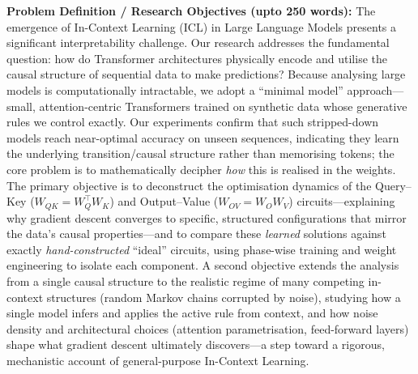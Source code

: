 \documentclass[12pt]{article}
\begin{document}
\medskip
\noindent\textbf{Problem Definition / Research Objectives (upto 250 words):}
The emergence of In-Context Learning (ICL) in Large Language Models presents a significant
interpretability challenge. Our research addresses the fundamental question: how do Transformer
architectures physically encode and utilise the causal structure of sequential data to make
predictions? Because analysing large models is computationally intractable, we adopt a
``minimal model'' approach---small, attention-centric Transformers trained on synthetic data
whose generative rules we control exactly. Our experiments confirm that such stripped-down
models reach near-optimal accuracy on unseen sequences, indicating they learn the underlying
transition/causal structure rather than memorising tokens; the core problem is to mathematically
decipher \emph{how} this is realised in the weights. The primary objective is to deconstruct the
optimisation dynamics of the Query--Key ($W_{QK}=W_Q^{\top}W_K$) and Output--Value
($W_{OV}=W_O W_V$) circuits---explaining why gradient descent converges to specific, structured
configurations that mirror the data's causal properties---and to compare these \emph{learned}
solutions against exactly \emph{hand-constructed} ``ideal'' circuits, using phase-wise training
and weight engineering to isolate each component. A second objective extends the analysis from a
single causal structure to the realistic regime of many competing in-context structures (random
Markov chains corrupted by noise), studying how a single model infers and applies the active rule
from context, and how noise density and architectural choices (attention parametrisation,
feed-forward layers) shape what gradient descent ultimately discovers---a step toward a rigorous,
mechanistic account of general-purpose In-Context Learning.
\end{document}
